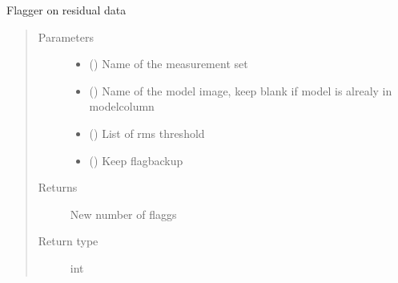 \documentclass[letterpaper,10pt,english]{sphinxmanual}
\begin{document}
\begin{fulllineitems}
\label{\detokenize{paircars:paircars.flagger.do_uvsub_flagger}}
\sphinxAtStartPar
Flagger on residual data
\begin{quote}\begin{description}
\item[{Parameters}] \leavevmode\begin{itemize}
\item {} 
\sphinxAtStartPar
{} () \textendash{} Name of the measurement set

\item {} 
\sphinxAtStartPar
{} () \textendash{} Name of the model image, keep blank if model is alrealy in modelcolumn

\item {} 
\sphinxAtStartPar
{} () \textendash{} List of rms threshold

\item {} 
\sphinxAtStartPar
{} () \textendash{} Keep flagbackup

\end{itemize}

\item[{Returns}] \leavevmode
\sphinxAtStartPar
New number of flaggs

\item[{Return type}] \leavevmode
\sphinxAtStartPar
int

\end{description}\end{quote}

\end{fulllineitems}

\end{document}
